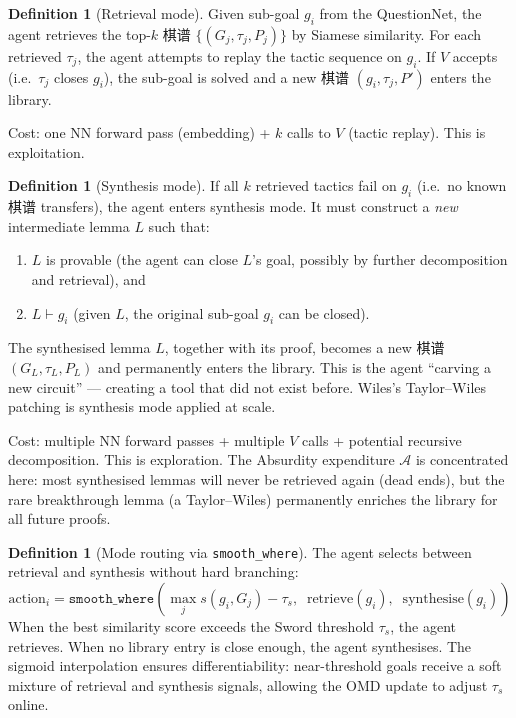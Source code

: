\documentclass[11pt,a4paper]{article}
\theoremstyle{definition}
\newtheorem{definition}[theorem]{Definition}
\theoremstyle{remark}
\begin{document}
\begin{definition}[Retrieval mode]\label{def:retrieval}
Given sub-goal $g_i$ from the QuestionNet, the agent retrieves the top-$k$ 棋谱 $\{(G_j, \tau_j, P_j)\}$ by Siamese similarity. For each retrieved $\tau_j$, the agent attempts to replay the tactic sequence on $g_i$. If $V$ accepts (i.e.\ $\tau_j$ closes $g_i$), the sub-goal is solved and a new 棋谱 $(g_i, \tau_j, P')$ enters the library.

Cost: one NN forward pass (embedding) + $k$ calls to $V$ (tactic replay). This is exploitation.
\end{definition}

\begin{definition}[Synthesis mode]\label{def:synthesis}
If all $k$ retrieved tactics fail on $g_i$ (i.e.\ no known 棋谱 transfers), the agent enters synthesis mode. It must construct a \emph{new} intermediate lemma $L$ such that:
\begin{enumerate}[nosep]
  \item[(i)] $L$ is provable (the agent can close $L$'s goal, possibly by further decomposition and retrieval), and
  \item[(ii)] $L \vdash g_i$ (given $L$, the original sub-goal $g_i$ can be closed).
\end{enumerate}
The synthesised lemma $L$, together with its proof, becomes a new 棋谱 $(G_L, \tau_L, P_L)$ and permanently enters the library. This is the agent ``carving a new circuit'' --- creating a tool that did not exist before. Wiles's Taylor--Wiles patching is synthesis mode applied at scale.

Cost: multiple NN forward passes + multiple $V$ calls + potential recursive decomposition. This is exploration. The Absurdity expenditure $\mathcal{A}$ is concentrated here: most synthesised lemmas will never be retrieved again (dead ends), but the rare breakthrough lemma (a Taylor--Wiles) permanently enriches the library for all future proofs.
\end{definition}

\begin{definition}[Mode routing via \texttt{smooth\_where}]\label{def:mode_route}
The agent selects between retrieval and synthesis without hard branching:
\[
  \text{action}_i = \texttt{smooth\_where}\!\left(\max_j s(g_i, G_j) - \tau_s,\;\; \text{retrieve}(g_i),\;\; \text{synthesise}(g_i)\right)
\]
When the best similarity score exceeds the Sword threshold $\tau_s$, the agent retrieves. When no library entry is close enough, the agent synthesises. The sigmoid interpolation ensures differentiability: near-threshold goals receive a soft mixture of retrieval and synthesis signals, allowing the OMD update to adjust $\tau_s$ online.
\end{definition}
\end{document}
